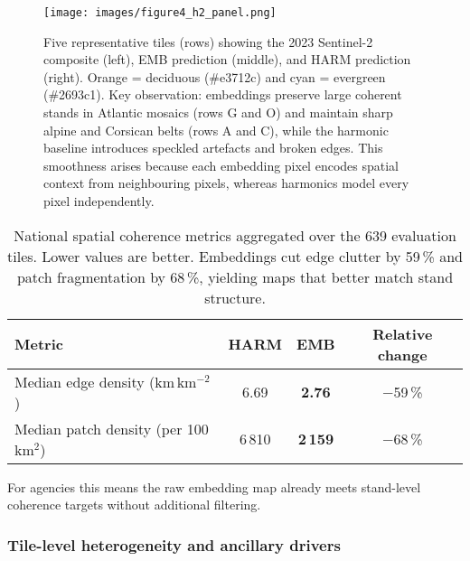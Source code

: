 \documentclass[utf8]{FrontiersinHarvard}
\begin{document}
\begin{figure}[H]
    \centering
    \texttt{[image: images/figure4\_h2\_panel.png]}
    \caption{Five representative tiles (rows) showing the 2023 Sentinel-2 composite (left), EMB prediction (middle), and HARM prediction (right). Orange = deciduous (\#e3712c) and cyan = evergreen (\#2693c1). Key observation: embeddings preserve large coherent stands in Atlantic mosaics (rows G and O) and maintain sharp alpine and Corsican belts (rows A and C), while the harmonic baseline introduces speckled artefacts and broken edges. This smoothness arises because each embedding pixel encodes spatial context from neighbouring pixels, whereas harmonics model every pixel independently.}
    \label{fig:h2_multiscale}
\end{figure}

\begin{table}[H]
    \centering
    \small
    \begin{tabular}{lccc}
        \toprule
        \textbf{Metric} & \textbf{HARM} & \textbf{EMB} & \textbf{Relative change} \\
        \midrule
        Median edge density (km\,km\(^{-2}\)) & 6.69 & \textbf{2.76} & −59\,\% \\
        Median patch density (per 100\,km\(^2\)) & 6\,810 & \textbf{2\,159} & −68\,\% \\
        \bottomrule
    \end{tabular}
    \caption{National spatial coherence metrics aggregated over the 639 evaluation tiles. Lower values are better. Embeddings cut edge clutter by 59\,\% and patch fragmentation by 68\,\%, yielding maps that better match stand structure.}
    \label{tab:coherence_summary}
\end{table}

For agencies this means the raw embedding map already meets stand-level coherence targets without additional filtering.

\subsubsection{Tile-level heterogeneity and ancillary drivers}
\end{document}
